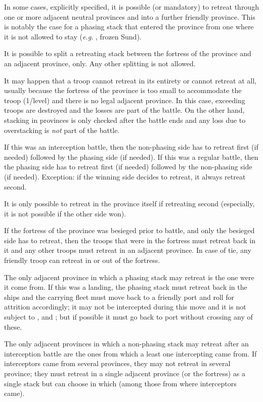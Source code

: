In some cases, explicitly specified, it is possible (or mandatory) to retreat
through one or more adjacent neutral provinces and into a further friendly
province. This is notably the case for a phasing stack that entered the
province from one where it is not allowed to stay (\emph{e.g.} \HRE, frozen
Sund).

It is possible to split a retreating stack between the fortress of the
province and an adjacent province, only. Any other splitting is not allowed.

It may happen that a troop cannot retreat in its entirety or cannot retreat at
all, usually because the fortress of the province is too small to accommodate
the troop (1\LD/level) and there is no legal adjacent province. In this case,
exceeding troops are destroyed and the losses are part of the battle. On the
other hand, stacking in provinces is only checked after the battle ends and
any loss due to overstacking is \emph{not} part of the battle.

If this was an interception battle, then the non-phasing side has to retreat
first (if needed) followed by the phasing side (if needed). If this was a
regular battle, then the phasing side has to retreat first (if needed)
followed by the non-phasing side (if needed). Exception: if the winning side
decides to retreat, it always retreat second.

It is only possible to retreat in the province itself if retreating second
(especially, it is not possible if the other side won).

If the fortress of the province was besieged prior to battle, and only the
besieged side has to retreat, then the troops that were in the fortress must
retreat back in it and any other troops must retreat in an adjacent
province. In case of tie, any friendly troop can retreat in or out of the
fortress.

The only adjacent province in which a phasing stack may retreat is the one
were it come from. If this was a landing, the phasing stack must retreat back
in the ships and the carrying fleet must move back to a friendly port and roll
for attrition accordingly; it may not be intercepted during this move and it
is not subject to \Presidios, \StraitFort and \USURE; but if possible it must
go back to port without crossing any of these.

The only adjacent provinces in which a non-phasing stack may retreat after an
interception battle are the ones from which a least one intercepting \LDE came
from. If interceptors came from several provinces, they may not retreat in
several province; they must retreat in a single adjacent province (or the
fortress) as a single stack but can choose in which (among those from where
interceptors came).


